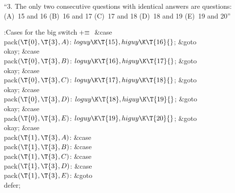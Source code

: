 ``3. The only two consecutive questions with identical answers are
questions:
(A)~15 and 16 (B)~16 and 17 (C)~17 and 18 (D)~18 and 19 (E)~19 and 20''

\Y\B\4:Cases for the big switch\X${}\mathrel+\equiv{}$\6
\4\&{case} \\{pack}${}(\T{0},\39\T{3},\39\|A){}$:\5
${}\\{loguy}\K\T{15},\39\\{higuy}\K\T{16}{}$;\5
\&{goto} \\{okay};\6
\4\&{case} \\{pack}${}(\T{0},\39\T{3},\39\|B){}$:\5
${}\\{loguy}\K\T{16},\39\\{higuy}\K\T{17}{}$;\5
\&{goto} \\{okay};\6
\4\&{case} \\{pack}${}(\T{0},\39\T{3},\39\|C){}$:\5
${}\\{loguy}\K\T{17},\39\\{higuy}\K\T{18}{}$;\5
\&{goto} \\{okay};\6
\4\&{case} \\{pack}${}(\T{0},\39\T{3},\39\|D){}$:\5
${}\\{loguy}\K\T{18},\39\\{higuy}\K\T{19}{}$;\5
\&{goto} \\{okay};\6
\4\&{case} \\{pack}${}(\T{0},\39\T{3},\39\|E){}$:\5
${}\\{loguy}\K\T{19},\39\\{higuy}\K\T{20}{}$;\5
\&{goto} \\{okay};\6
\4\&{case} \\{pack}${}(\T{1},\39\T{3},\39\|A){}$:\5
\&{case} \\{pack}${}(\T{1},\39\T{3},\39\|B){}$:\5
\&{case} \\{pack}${}(\T{1},\39\T{3},\39\|C){}$:\5
\&{case} \\{pack}${}(\T{1},\39\T{3},\39\|D){}$:\5
\&{case} \\{pack}${}(\T{1},\39\T{3},\39\|E){}$:\5
\&{goto} \\{defer};\par
\fi

